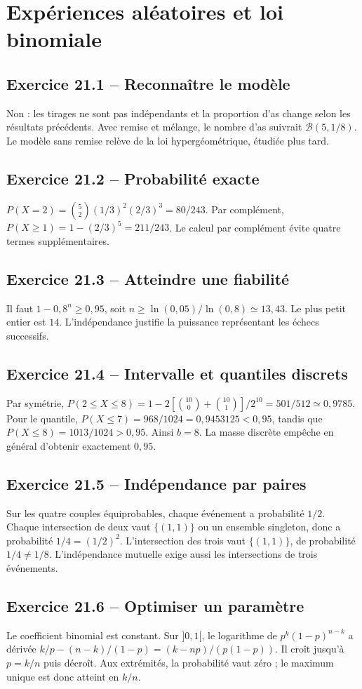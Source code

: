 \chapter{Expériences aléatoires et loi binomiale}
\section*{Exercice 21.1 -- Reconnaître le modèle}
Non : les tirages ne sont pas indépendants et la proportion d'as change selon les résultats précédents. Avec remise et mélange, le nombre d'as suivrait $\mathcal B(5,1/8)$. Le modèle sans remise relève de la loi hypergéométrique, étudiée plus tard.

\section*{Exercice 21.2 -- Probabilité exacte}
$P(X=2)=\binom52(1/3)^2(2/3)^3=80/243$. Par complément, $P(X\ge1)=1-(2/3)^5=211/243$. Le calcul par complément évite quatre termes supplémentaires.

\section*{Exercice 21.3 -- Atteindre une fiabilité}
Il faut $1-0{,}8^n\ge0{,}95$, soit $n\ge\ln(0{,}05)/\ln(0{,}8)\simeq13{,}43$. Le plus petit entier est $14$. L'indépendance justifie la puissance représentant les échecs successifs.

\section*{Exercice 21.4 -- Intervalle et quantiles discrets}
Par symétrie, $P(2\le X\le8)=1-2[\binom{10}0+\binom{10}1]/2^{10}=501/512\simeq0{,}9785$. Pour le quantile, $P(X\le7)=968/1024=0{,}9453125<0{,}95$, tandis que $P(X\le8)=1013/1024>0{,}95$. Ainsi $b=8$. La masse discrète empêche en général d'obtenir exactement $0{,}95$.

\section*{Exercice 21.5 -- Indépendance par paires}
Sur les quatre couples équiprobables, chaque événement a probabilité $1/2$. Chaque intersection de deux vaut $\{(1,1)\}$ ou un ensemble singleton, donc a probabilité $1/4=(1/2)^2$. L'intersection des trois vaut $\{(1,1)\}$, de probabilité $1/4\ne1/8$. L'indépendance mutuelle exige aussi les intersections de trois événements.

\section*{Exercice 21.6 -- Optimiser un paramètre}
Le coefficient binomial est constant. Sur $]0,1[$, le logarithme de $p^k(1-p)^{n-k}$ a dérivée $k/p-(n-k)/(1-p)=(k-np)/(p(1-p))$. Il croît jusqu'à $p=k/n$ puis décroît. Aux extrémités, la probabilité vaut zéro ; le maximum unique est donc atteint en $k/n$.
